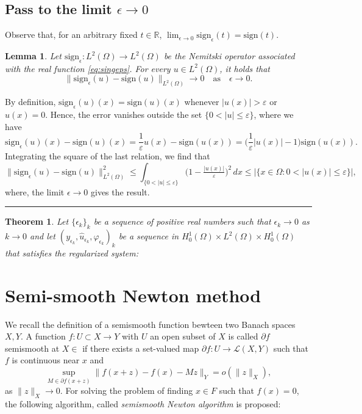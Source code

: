 \documentclass[11pt,a4paper]{amsart}
\newcommand{\kw}{\rule{2mm}{2mm}}
\newcommand{\om}{\Omega}
\newcommand{\reals}{\mathbb{R}}
\newcommand{\sign}{\mathrm{sign}}
\renewenvironment{proof}{{Proof.}}{\hfill\kw}
\newtheorem{lemma}{{Lemma}}
\newtheorem{theorem}{{Theorem}}
\newcommand{\norm}[1]{\lVert #1 \rVert}
\begin{document}
\subsection{Pass to the limit $\epsilon \to 0$} Observe that, for an arbitrary fixed $t\in\reals$, $\lim_{\epsilon \to 0} \sign_\epsilon(t)=\sign(t)$.


\begin{lemma}
Let $\sign_\epsilon : L^2(\om) \to L^2(\om)$ be the Nemitski operator associated with the real function \eqref{eq:singeps}. For every $u\in L^2(\om)$, it holds that
\begin{equation}
    \|\sign_\epsilon(u)-\sign(u)\|_{L^2(\om)} \to 0 \quad \text{as} \quad \epsilon\to 0.
\end{equation}
\end{lemma}
\begin{proof}
By definition, $\sign_\epsilon(u)(x) = \sign(u)(x)$ whenever $|u(x)| > \varepsilon$ or $u(x)=0$. 
Hence, the error vanishes outside the set $\{ 0<|u|\leq \varepsilon \}$, where we have
\[
\sign_{\epsilon}(u)(x) - \sign(u)(x)
= \dfrac{1}{\varepsilon}u(x) - \sign(u(x))
= \Big( \dfrac{1}{\varepsilon}|u(x)| - 1 \Big)\sign(u(x)).
\]
Integrating the square of the last relation, we find that 
\[
\|\sign_\epsilon(u) - \sign(u)\|_{L^2(\om)}^2
\leq\int_{\{0<|u|\leq \varepsilon\}} \Big( 1 - \tfrac{|u(x)|}{\varepsilon} \Big)^2 \, dx\leq |\{x\in\om:0<|u(x)|\leq \varepsilon\}|,
\]
where, the limit $\epsilon\to 0$ gives the result.
\end{proof}
\begin{theorem} Let $\{\epsilon_k\}_k$ be a sequence of positive real numbers such that $\epsilon_k\to0$ as $k\to 0$ and let ${(y_{\epsilon_k},\hat u_{\epsilon_k},\varphi_{\epsilon_k})}_k$ be a sequence in $H_0^1(\om)\times L^2(\om)\times H_0^1(\om)$ that satisfies the regularized system:

\end{theorem}
\section{Semi-smooth Newton method} 

We recall the definition of a semismooth function bewteen two Banach spaces $X, Y$. A function $f:U\subset X\to Y$ with $U$ an open subset of $X$ is called $\partial f$ semismooth at $X\in $ if there exists a set-valued map $\partial f: U\to \mathcal{L}(X, Y)$ such that $f$ is continuous near $x$ and
\[
\sup_{M\in\partial f(x+z)}\norm{f(x+z)-f(x)-Mz}_{Y}=o(\norm{z}_{X}),
\]
 as $\norm{z}_{X}\to 0$. For solving the problem of finding $x\in F$ such that $f(x)=0$, the following algorithm, called \textit{semismooth Newton algorithm} is proposed:
 
\end{document}
